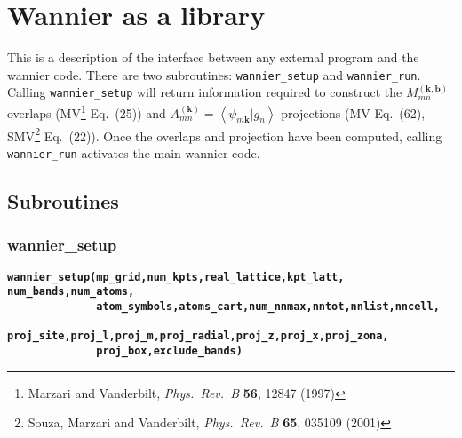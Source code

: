 \chapter{Wannier as a library}

This is a description of the interface between any external program and
the wannier code. There are two subroutines: \verb#wannier_setup# and
\verb#wannier_run#. Calling \verb#wannier_setup# will return
information required to 
construct the $M_{mn}^{(\mathbf{k,b})}$ overlaps (MV\footnote{Marzari
  and Vanderbilt, \textit{Phys.~Rev.~B} \textbf{56}, 12847 (1997)}
Eq.~(25)) and $A_{mn}^{(\mathbf{k})}=\left\langle
\psi_{m\mathbf{k}}|g_{n}\right\rangle$ projections (MV
Eq.~(62), SMV\footnote{Souza, Marzari and Vanderbilt,
  \textit{Phys.~Rev.~B} \textbf{65}, 035109 (2001)} Eq.~(22)). Once 
the overlaps and projection have been computed, calling
\verb#wannier_run# activates the main wannier code.


\section{Subroutines}

\subsection{wannier\_setup}

{\noindent \bf \verb#wannier_setup(mp_grid,num_kpts,real_lattice,kpt_latt,#
\verb#num_bands,num_atoms,#\\
\verb#              atom_symbols,atoms_cart,num_nnmax,nntot,nnlist,nncell,#\\
\verb#              proj_site,proj_l,proj_m,proj_radial,proj_z,proj_x,proj_zona,#\\
\verb#              proj_box,exclude_bands)   #}

